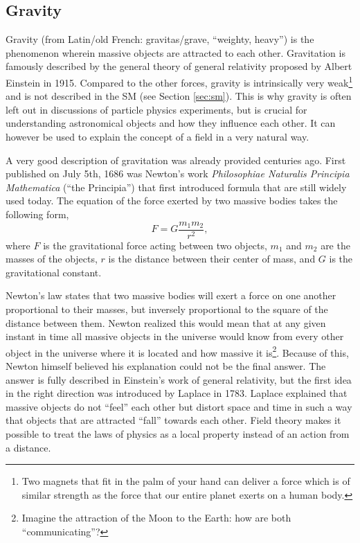 \subsection{Gravity}
Gravity (from Latin/old French: gravitas/grave, ``weighty, heavy'') is the phenomenon wherein massive objects are attracted to each other. Gravitation is famously described by the general theory of general relativity proposed by Albert Einstein in 1915. Compared to the other forces, gravity is intrinsically very weak\footnote{Two magnets that fit in the palm of your hand can deliver a force which is of similar strength as the force that our entire planet exerts on a human body.} and is not described in the SM (see Section \ref{sec:sm}). This is why gravity is often left out in discussions of particle physics experiments, but is crucial for understanding astronomical objects and how they influence each other. It can however be used to explain the concept of a field in a very natural way.

A very good description of gravitation was already provided centuries ago. First published on July 5th, 1686 was Newton's work \textit{Philosophiae Naturalis Principia Mathematica} (``the Principia'') that first introduced formula that are still widely used today. The equation of the force exerted by two massive bodies takes the following form,
\begin{equation}
F = G \frac{m_1 m_2}{r^2},
\end{equation}
where $F$ is the gravitational force acting between two objects, $m_1$ and $m_2$ are the masses of the objects, $r$ is the distance between their center of mass, and $G$ is the gravitational constant.

Newton's law states that two massive bodies will exert a force on one another proportional to their masses, but inversely proportional to the square of the distance between them. Newton realized this would mean that at any given instant in time all massive objects in the universe would know from every other object in the universe where it is located and how massive it is\footnote{Imagine the attraction of the Moon to the Earth: how are both ``communicating''?}. Because of this, Newton himself believed his explanation could not be the final answer. The answer is fully described in Einstein's work of general relativity, but the first idea in the right direction was introduced by Laplace in 1783. Laplace explained that massive objects do not ``feel'' each other but distort space and time in such a way that objects that are attracted ``fall'' towards each other. Field theory makes it possible to treat the laws of physics as a local property instead of an action from a distance.


